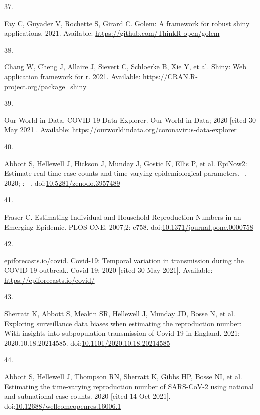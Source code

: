 \documentclass[10pt,letterpaper]{article}
\newlength{\cslhangindent}
\newlength{\csllabelwidth}
\newlength{\cslentryspacingunit} %
\newenvironment{CSLReferences}[2] %
 {%
  \setlength{\parindent}{0pt}
  \ifodd #1
  \let\oldpar\par
  \def\par{\hangindent=\cslhangindent\oldpar}
  \fi
  \setlength{\parskip}{#2\cslentryspacingunit}
 }%
 {}
\newcommand{\CSLLeftMargin}[1]{\parbox[t]{\csllabelwidth}{#1}}
\newcommand{\CSLRightInline}[1]{\parbox[t]{\linewidth - \csllabelwidth}{#1}\break}
\begin{document}
\begin{CSLReferences}{0}{0}
\leavevmode{}%
\CSLLeftMargin{37. }%
\CSLRightInline{Fay C, Guyader V, Rochette S, Girard C. Golem: A
framework for robust shiny applications. 2021. Available:
\url{https://github.com/ThinkR-open/golem}}

\leavevmode{}%
\CSLLeftMargin{38. }%
\CSLRightInline{Chang W, Cheng J, Allaire J, Sievert C, Schloerke B, Xie
Y, et al. Shiny: Web application framework for r. 2021. Available:
\url{https://CRAN.R-project.org/package=shiny}}

\leavevmode{}%
\CSLLeftMargin{39. }%
\CSLRightInline{Our World in Data. {COVID-19 Data Explorer}. {Our World
in Data}; 2020 {[}cited 30 May 2021{]}. Available:
\url{https://ourworldindata.org/coronavirus-data-explorer}}

\leavevmode{}%
\CSLLeftMargin{40. }%
\CSLRightInline{Abbott S, Hellewell J, Hickson J, Munday J, Gostic K,
Ellis P, et al. EpiNow2: Estimate real-time case counts and time-varying
epidemiological parameters. -. 2020;-: --.
doi:\href{https://doi.org/10.5281/zenodo.3957489}{10.5281/zenodo.3957489}}

\leavevmode{}%
\CSLLeftMargin{41. }%
\CSLRightInline{Fraser C. Estimating {Individual} and {Household
Reproduction Numbers} in an {Emerging Epidemic}. PLOS ONE. 2007;2: e758.
doi:\href{https://doi.org/10.1371/journal.pone.0000758}{10.1371/journal.pone.0000758}}

\leavevmode{}%
\CSLLeftMargin{42. }%
\CSLRightInline{epiforecasts.io/covid. Covid-19: {Temporal} variation in
transmission during the {COVID-19} outbreak. {Covid-19}; 2020 {[}cited
30 May 2021{]}. Available: \url{https://epiforecasts.io/covid/}}

\leavevmode{}%
\CSLLeftMargin{43. }%
\CSLRightInline{Sherratt K, Abbott S, Meakin SR, Hellewell J, Munday JD,
Bosse N, et al. Exploring surveillance data biases when estimating the
reproduction number: With insights into subpopulation transmission of
{Covid-19} in {England}. 2021; 2020.10.18.20214585.
doi:\href{https://doi.org/10.1101/2020.10.18.20214585}{10.1101/2020.10.18.20214585}}

\leavevmode{}%
\CSLLeftMargin{44. }%
\CSLRightInline{Abbott S, Hellewell J, Thompson RN, Sherratt K, Gibbs
HP, Bosse NI, et al. Estimating the time-varying reproduction number of
{SARS-CoV-2} using national and subnational case counts. 2020 {[}cited
14 Oct 2021{]}.
doi:\href{https://doi.org/10.12688/wellcomeopenres.16006.1}{10.12688/wellcomeopenres.16006.1}}


\end{CSLReferences}
\end{document}
